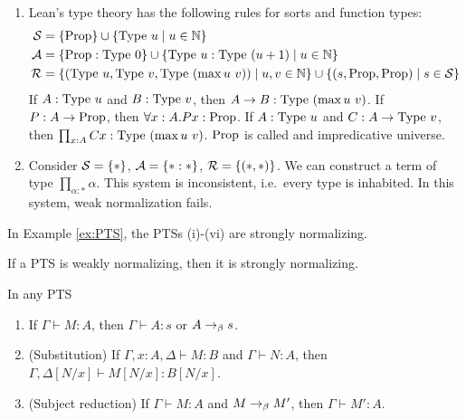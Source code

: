 \begin{example}
\begin{enumerate}
{        }
        \item{
            Lean's type theory has the following rules for sorts and function types: 
            \begin{align*}
                \fS &= \{\proptype\} \cup \{ \typeu{u} \mid u \in \bN\} \\
                \fA &= \{\proptype : \typeu{0}\} \cup \{\typeu{u} : \typeu{(u + 1)} \mid u \in \bN\} \\
                \fR &= \{ (\typeu{u}, \typeu{v}, \typeu{(\max u\ v)}) \mid u,v \in \bN\} \cup \{(s, \proptype, \proptype) \mid s \in \fS\}
            \end{align*}
            If $A : \mathrm{Type}\ u$ and $B : \mathrm{Type}\ v$, then $A \to B : \mathrm{Type}\ (\max u\ v)$.
            If $P : A \to \mathrm{Prop}$, then $\forall x : A. Px : \mathrm{Prop}$. 
            If $A : \mathrm{Type}\ u$ and $C : A \to \mathrm{Type}\ v$, then $\prod_{x : A} Cx : \mathrm{Type}\ (\max u \ v)$.
            $\mathrm{Prop}$ is called and \alert{impredicative universe}.
        }
        \item {
            Consider $\mathcal{S} = \{*\}$, $\mathcal{A} = \{* :*\}$, $\mathcal{R} = \{(*, *)\}$. 
            We can construct a term of type $\prod_{\alpha : *} \alpha$. 
            This system is \alert{inconsistent}, i.e.\ every type is inhabited. 
            In this system, weak normalization fails. 
        }
    \end{enumerate}
\end{example}

\begin{boxthm}
    In Example \ref{ex:PTS}, the PTSs (i)-(vi) are strongly normalizing.
\end{boxthm}

\begin{conj}
    If a PTS is weakly normalizing, then it is strongly normalizing. 
\end{conj}

\begin{boxprop}\label{prop:PTS}
    In any PTS 
    \begin{enumerate}
        \item If $\Gamma \vdash M : A$, then $\Gamma \vdash A : s$ or $A \to_{\beta} s$.
        \item (Substitution) If $\Gamma, x : A, \Delta \vdash M : B$ and $\Gamma \vdash N : A$, then $\Gamma, \Delta[N/x] \vdash M[N/x] : B[N/x]$.
        \item (Subject reduction) If $\Gamma \vdash M : A$ and $M \to_{\beta} M'$, then $\Gamma \vdash M' : A$.
    \end{enumerate}
\end{boxprop}

